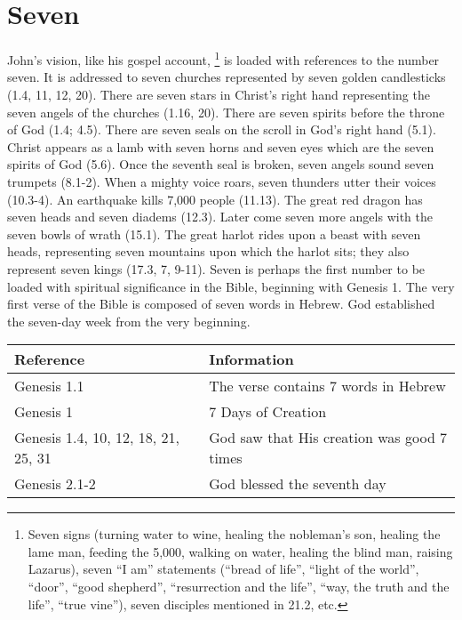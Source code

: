 \section*{Seven}
John's vision, like his gospel account,%
	\footnote{Seven signs (turning water to wine, healing the nobleman's son, healing the lame man, feeding the 5,000, walking on water, healing the blind man, raising Lazarus), seven ``I am'' statements (``bread of life'', ``light of the world'', ``door'', ``good shepherd'', ``resurrection and the life'', ``way, the truth and the life'', ``true vine''), seven disciples mentioned in 21.2, etc.} %
is loaded with references to the number seven. It is addressed to seven churches represented by seven golden candlesticks (1.4, 11, 12, 20). There are seven stars in Christ's right hand representing the seven angels of the churches (1.16, 20). There are seven spirits before the throne of God (1.4; 4.5). There are seven seals on the scroll in God's right hand (5.1). Christ appears as a lamb with seven horns and seven eyes which are the seven spirits of God (5.6). Once the seventh seal is broken, seven angels sound seven trumpets (8.1-2). When a mighty voice roars, seven thunders utter their voices (10.3-4). An earthquake kills 7,000 people (11.13). The great red dragon has seven heads and seven diadems (12.3). Later come seven more angels with the seven bowls of wrath (15.1). The great harlot rides upon a beast with seven heads, representing seven mountains upon which the harlot sits; they also represent seven kings (17.3, 7, 9-11). 
\newline\newline
Seven is perhaps the first number to be loaded with spiritual significance in the Bible, beginning with Genesis 1. The very first verse of the Bible is composed of seven words in Hebrew. God established the seven-day week from the very beginning. 
\newline\newline
\begin{tabularx}{\textwidth}{l X}
\toprule
\textbf{Reference} & \textbf{Information}\\
\midrule
Genesis 1.1 & The verse contains 7 words in Hebrew \\
\addlinespace
Genesis 1 & 7 Days of Creation \\
\addlinespace
Genesis 1.4, 10, 12, 18, 21, 25, 31 & God saw that His creation was good 7 times \\
\addlinespace
Genesis 2.1-2 & God blessed the seventh day\\
\bottomrule
\end{tabularx}

